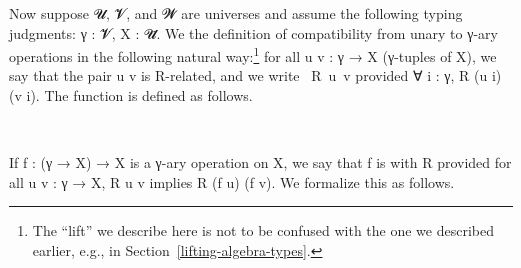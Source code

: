 \documentclass[a4paper,UKenglish,cleveref,autoref,thm-restate,11pt]{lipics-v2021}
\begin{document}
Now suppose \ab 𝓤, \ab 𝓥, and \ab 𝓦 are universes and assume the following typing judgments: \ab γ \as : \ab 𝓥\af ̇, \ab X \as : \ab 𝓤\af ̇. We  the definition of compatibility from unary to \ab γ-ary operations in the following natural way:\footnote{The ``lift'' we describe here is not to be confused with the one we described earlier, e.g., in Section~\ref{lifting-algebra-types}.} for all \ab u \ab v \as : \ab γ \as → \ab X (\ab γ-tuples of \ab X), we say that the pair \ab u \ab v is \ab R-related, and we write ~\ab R~\ab u~\ab v provided \as ∀ \ab i \as : \ab γ, \ab R (\ab u \ab i) (\ab v \ab i). The function  is defined as follows.
\ccpad
\begin{code}%
\>[1]\AgdaSpace{}%
\AgdaSymbol{:}\AgdaSpace{}%
\AgdaSpace{}%
\AgdaSpace{}%
\AgdaSpace{}%
\AgdaSpace{}%
\AgdaSymbol{(}\AgdaSpace{}%
\AgdaSpace{}%
\AgdaSymbol{)}\AgdaSpace{}%
\AgdaSpace{}%
\AgdaSymbol{(}\AgdaSpace{}%
\AgdaSpace{}%
\AgdaSymbol{)}\AgdaSpace{}%
\AgdaSpace{}%
\AgdaSpace{}%
\AgdaSpace{}%
%
\<%
\\
%
\>[1]\AgdaSpace{}%
\AgdaSpace{}%
\AgdaSpace{}%
\AgdaSpace{}%
\AgdaSymbol{=}\AgdaSpace{}%
\AgdaSpace{}%
\AgdaSpace{}%
\AgdaSpace{}%
\AgdaSpace{}%
\AgdaSymbol{(}\AgdaSpace{}%
\AgdaSymbol{)}\AgdaSpace{}%
\AgdaSymbol{(}\AgdaSpace{}%
\AgdaSymbol{)}\<%
\end{code}
\ccpad
If \ab f \as : (\ab γ \as → \ab X) \as → \ab X is a \ab γ-ary operation on \ab X, we say that \ab f is  with \ab R provided for all \ab u \ab v : \ab γ \as → \ab X,  \ab R \ab u \ab v implies \ab R (\ab f \ab u) (\ab f \ab v). We formalize this as follows.
\ccpad
\end{document}
